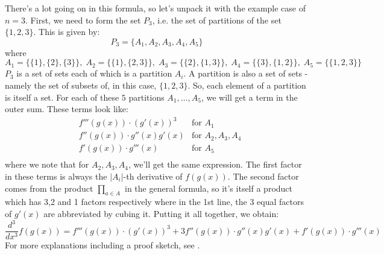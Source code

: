 \medskip
There's a lot going on in this formula, so let's unpack it with the example case of $n=3$. First, we need to form the set $P_3$, i.e. the set of partitions of the set $\{1,2,3\}$. This is given by:
\begin{equation}
P_3 = \{ A_1, A_2, A_3, A_4, A_5 \}
\end{equation}
where
\begin{equation}
A_1 = \{ \{1\},\{2\},\{3\} \},  \;
A_2 = \{ \{1\},\{2,3\} \},      \;
A_3 = \{ \{2\},\{1,3\} \},      \;
A_4 = \{ \{3\},\{1,2\} \},      \;
A_5 = \{ \{1,2,3\} \}
\end{equation}
$P_3$ is a set of sets each of which is a partition $A_i$. A partition is also a set of sets - namely the set of subsets of, in this case, $\{1,2,3\}$. So, each element of a partition is itself a set. For each of these $5$ partitions $A_1,\ldots,A_5$, we will get a term in the outer sum. These terms look like:
\begin{eqnarray}
&f'''(g(x)) \cdot (g'(x))^3        & \text{for $A_1$} \\
&f''(g(x))  \cdot g''(x) g'(x)     & \text{for $A_2,A_3,A_4$} \\
&f'(g(x))   \cdot g'''(x)          & \text{for $A_5$} \\
\end{eqnarray}
where we note that for $A_2,A_3,A_4$, we'll get the same expression. The first factor in these terms is always the $|A_i|$-th derivative of $f(g(x))$. The second factor comes from the product $\prod_{a \in A}$ in the general formula, so it's itself a product which has 3,2 and 1 factors respectively where in the 1st line, the 3 equal factors of $g'(x)$ are abbreviated by cubing it. Putting it all together, we obtain:
\begin{equation}
\frac{d^3}{d x^3} f(g(x)) = 
  f'''(g(x)) \cdot (g'(x))^3 +
3 f''(g(x))  \cdot g''(x)    g'(x)  + 
  f'(g(x))   \cdot g'''(x) 
\end{equation}
For more explanations including a proof sketch, see \cite{YT_FaaDiBruno}.

